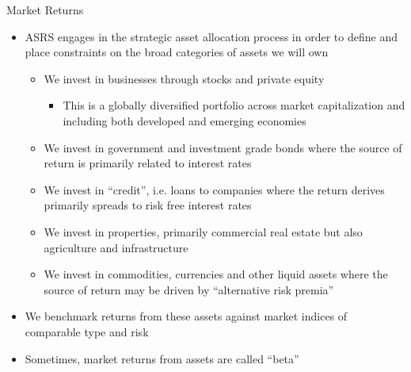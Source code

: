 \documentclass[10pt,english]{beamer}\usepackage[]{graphicx}\usepackage[]{color}
\begin{document}
%
\begin{frame}{Market Returns}
\begin{itemize}
\item ASRS engages in the strategic asset allocation process in order to
define and place constraints on the broad categories of assets we
will own
\begin{itemize}
\item We invest in businesses through stocks and private equity
\begin{itemize}
\item This is a globally diversified portfolio across market capitalization
and including both developed and emerging economies
\end{itemize}
\item We invest in government and investment grade bonds where the source
of return is primarily related to interest rates
\item We invest in ``credit'', i.e. loans to companies where the return
derives primarily spreads to risk free interest rates
\item We invest in properties, primarily commercial real estate but also
agriculture and infrastructure
\item We invest in commodities, currencies and other liquid assets where
the source of return may be driven by ``alternative risk premia'' 
\end{itemize}
\item We benchmark returns from these assets against market indices of comparable
type and risk
\item Sometimes, market returns from assets are called ``beta''
\end{itemize}
\end{frame}
%
\end{document}
